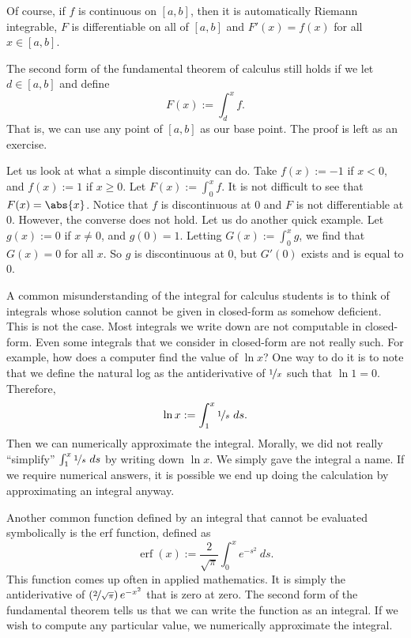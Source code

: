 \documentclass[12pt]{book}
\begin{document}
Of course, if $f$ is continuous on $[a,b]$, then it is automatically Riemann
integrable, $F$ is differentiable on all of $[a,b]$ and $F'(x) = f(x)$ for
all $x \in [a,b]$.

\begin{remark}
The second form of the fundamental theorem of calculus still holds if
we let $d \in [a,b]$ and define
\begin{equation*}
F(x) := \int_d^x f .
\end{equation*}
That is, we can use any point of $[a,b]$ as our base point.
The proof is
left as an exercise.
\end{remark}

Let us look at what a simple discontinuity can do.
Take $f(x) := -1$ if $x
< 0$, and $f(x) := 1$ if $x \geq 0$.
Let $F(x) := \int_0^x f$.
It is not
difficult to see that $F(x) = \abs{x}$.
Notice that $f$ is discontinuous at
$0$ and $F$ is not differentiable at $0$.
However, the converse does not
hold.
Let us do another quick example.
Let $g(x) := 0$ if $x \not= 0$, and $g(0) = 1$.
Letting $G(x) :=
\int_0^x g$, we find that $G(x) = 0$ for all $x$.
So $g$ is discontinuous
at $0$, but $G'(0)$ exists and is equal to 0.

A common misunderstanding of the integral for calculus students is to
think of integrals whose solution cannot be given in closed-form as somehow
deficient.
This is not the case.
Most integrals we write down are not
computable in closed-form.
Even some integrals that we consider
in closed-form are not really such.
For example, how does a computer find
the value of $\ln x$?
  One way to do it is to note that
we define the natural log as the antiderivative of $\nicefrac{1}{x}$
such that $\ln 1 = 0$.
Therefore,
\begin{equation*}
\ln x := \int_1^x \nicefrac{1}{s}~ds .
\end{equation*}
Then we can numerically approximate the integral.
Morally,
we did not really ``simplify'' $\int_1^x \nicefrac{1}{s}~ds$ by
writing down $\ln x$.
We simply gave the integral a name.
If we require numerical answers,
it is possible we end up doing
the calculation by approximating an integral anyway.

Another common function defined by an integral that cannot
be evaluated symbolically
is the erf function, defined as
\begin{equation*}
\operatorname{erf}(x) := \frac{2}{\sqrt{\pi}} \int_0^x e^{-s^2} ~ds .
\end{equation*}
This function comes up often in applied mathematics.
It is simply 
the antiderivative of $\left(\nicefrac{2}{\sqrt{\pi}}\right) e^{-x^2}$
that is zero at zero.
The second form of the fundamental theorem tells us that we can write the function
as an integral.
If we wish to compute any particular value, we 
numerically approximate the integral.
\end{document}

